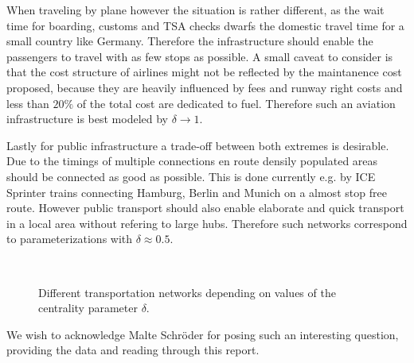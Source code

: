 \documentclass[aps,pra,showpacs,preprintnumbers,amsmath,amssymb,footinbib]{revtex4-2}
\begin{document}
    When traveling by plane however the situation is rather different, as the wait time for boarding, customs and TSA checks dwarfs the domestic travel time for a small country like Germany. 
    Therefore the infrastructure should enable the passengers to travel with as few stops as possible.
    A small caveat to consider is that the cost structure of airlines might not be reflected by the maintanence cost proposed, because they are heavily influenced by fees and runway right costs and less than $20\%$ \cite{statista.kerosin} of the total cost are dedicated to fuel.  
    Therefore such an aviation infrastructure is best modeled by $\delta \rightarrow 1$.

    Lastly for public infrastructure a trade-off between both extremes is desirable. 
    Due to the timings of multiple connections en route densily populated areas should be connected as good as possible.
    This is done currently e.g. by ICE Sprinter trains connecting Hamburg, Berlin and Munich on a almost stop free route.
    However public transport should also enable elaborate and quick transport in a local area without refering to large hubs.
    Therefore such networks correspond to parameterizations with $\delta \approx 0.5$.

    \begin{figure}[H]
        \centering
        \\
        \caption{Different transportation networks depending on values of the centrality parameter $\delta$.}
        \label{fig:results}
    \end{figure}


    \begin{acknowledgments}
        We wish to acknowledge Malte Schröder for posing such an interesting question, providing the data and reading through this report. 
    \end{acknowledgments}
\end{document}
